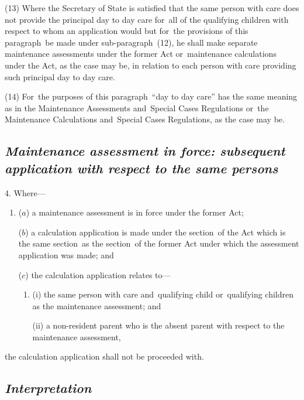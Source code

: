 \documentclass[12pt,a4paper]{article}
\begin{document}
(13) Where the Secretary of State is satisfied that the same person with care does not provide the principal day to day care for~all of the qualifying children with respect to whom an application would but for~the provisions of this paragraph~be made under sub-paragraph~(12), he shall make separate maintenance assessments under the former Act or~maintenance calculations under the Act, as the case may be, in relation to each person with care providing such principal day to day care.

(14) For~the purposes of this paragraph~“day to day care” has the same meaning as in the Maintenance Assessments and~Special Cases Regulations or~the Maintenance Calculations and~Special Cases Regulations, as the case may be.


\subsection*{\itshape Maintenance assessment in force: subsequent application with respect to the same persons}

4.  Where—
\begin{enumerate}\item[]
($a$) a maintenance assessment is in force under the former Act;

($b$) a calculation application is made 
under the section~of the Act which is the same section~as the section~of the former Act under which the assessment application was made; and

($c$) the calculation application relates to—
\begin{enumerate}\item[]
(i) the same person with care and~qualifying child or~qualifying children as the maintenance assessment; and

(ii) a non-resident parent who is the absent parent with respect to the maintenance assessment,
\end{enumerate}
\end{enumerate}
the calculation application shall not be proceeded with.


\subsection*{\itshape Interpretation}
\end{document}
